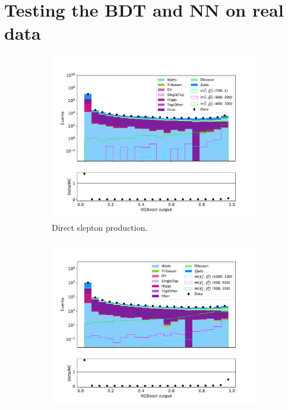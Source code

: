 \section{Testing the BDT and NN on real data}



\begin{figure}[H]
    \centering
    \begin{subfigure}[t!]{0.49\textwidth}
        \includegraphics[width = \textwidth]{Figures/Stacked/stackedplot_BDT_All_level_slepslep.pdf}
        \caption{Direct slepton production.}
        \label{fig:SlepslepNNLow}
    \end{subfigure}
    \begin{subfigure}[t!]{0.49\textwidth}
        \includegraphics[width = \textwidth]{Figures/Stacked/stackedplot_BDT_All_level_slepsnu.pdf}

\end{subfigure}
\end{figure}
